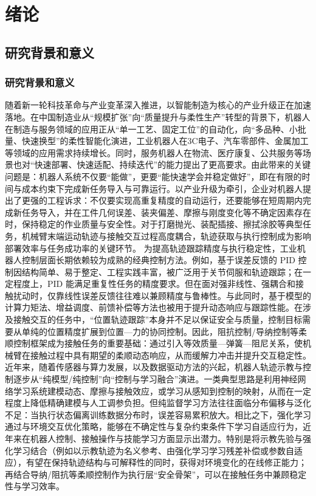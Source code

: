 \chapter{绪论}
%
\section{研究背景和意义}
\subsection{研究背景和意义}
随着新一轮科技革命与产业变革深入推进，以智能制造为核心的产业升级正在加速落地。在中国制造业从“规模扩张”向“质量提升与柔性生产”转型的背景下，机器人在制造与服务领域的应用正从“单一工艺、固定工位”的自动化，向“多品种、小批量、快速换型”的柔性智能化演进，工业机器人在3C电子、汽车零部件、金属加工等领域的应用需求持续增长。同时，服务机器人在物流、医疗康复、公共服务等场景也对“快速部署、快速适配、持续迭代”的能力提出了更高要求。由此带来的关键问题是：机器人系统不仅要“能做”，更要“能快速学会并稳定做好”，即在有限的时间与成本约束下完成新任务导入与可靠运行。以产业升级为牵引，企业对机器人提出了更强的工程诉求：不仅要实现高重复精度的自动运行，还要能够在短周期内完成新任务导入，并在工件几何误差、装夹偏差、摩擦与刚度变化等不确定因素存在时，保持稳定的作业质量与安全性。对于打磨抛光、装配插接、擦拭涂胶等典型任务，机械臂末端运动轨迹与接触交互过程高度耦合，轨迹获取与执行控制成为影响部署效率与任务成功率的关键环节。
为提高轨迹跟踪精度与执行稳定性，工业机器人控制层面长期依赖较为成熟的经典控制方法。例如，基于误差反馈的 PID 控制因结构简单、易于整定、工程实践丰富，被广泛用于关节伺服和轨迹跟踪；在一定程度上，PID 能满足重复性任务的精度要求。但在面对强非线性、强耦合和接触扰动时，仅靠线性误差反馈往往难以兼顾精度与鲁棒性。与此同时，基于模型的计算力矩法、增益调度、前馈补偿等方法也被用于提升动态响应与跟踪性能。在涉及接触交互的任务中，“位置轨迹跟踪”本身并不足以保证安全与质量，控制目标需要从单纯的位置精度扩展到位置—力的协同控制。因此，阻抗控制/导纳控制等柔顺控制框架成为接触任务的重要基础：通过引入等效质量—弹簧—阻尼关系，使机械臂在接触过程中具有期望的柔顺动态响应，从而缓解力冲击并提升交互稳定性。近年来，随着传感器与算力发展，以及数据驱动方法的兴起，机器人轨迹示教与控制逐步从“纯模型/纯控制”向“控制与学习融合”演进。一类典型思路是利用神经网络学习系统建模动态、摩擦与接触效应，或学习从感知到控制的映射，从而在一定程度上降低精确建模与人工调参负担。但纯监督学习方法往往面临分布偏移与泛化不足：当执行状态偏离训练数据分布时，误差容易累积放大。相比之下，强化学习通过与环境交互优化策略，能够在不确定性与复杂约束条件下学习自适应行为，近年来在机器人控制、接触操作与技能学习方面显示出潜力。特别是将示教先验与强化学习结合（例如以示教轨迹为名义参考、由强化学习学习残差补偿或参数自适应），有望在保持轨迹结构与可解释性的同时，获得对环境变化的在线修正能力；再结合导纳/阻抗等柔顺控制作为执行层“安全骨架”，可以在接触任务中兼顾稳定性与学习效率。
